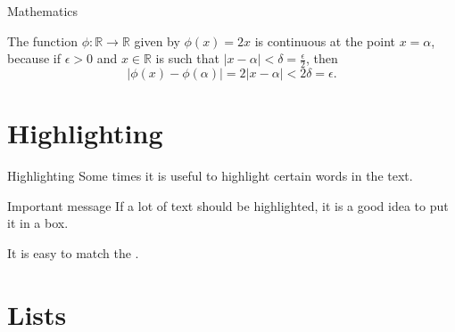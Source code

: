 \documentclass[UKenglish]{beamer}
\begin{document}
\begin{frame}{Mathematics}
    \begin{example}
        The function \(\phi \colon \mathbb{R} \to \mathbb{R}\) given by \(\phi(x) = 2x\) is continuous at the point \(x = \alpha\),
        because if \(\epsilon > 0\) and \(x \in \mathbb{R}\) is such that \(\lvert x - \alpha \rvert < \delta = \frac{\epsilon}{2}\),
        then
        \begin{equation*}
            \lvert \phi(x) - \phi(\alpha)\rvert = 2\lvert x - \alpha \rvert < 2\delta = \epsilon.
        \end{equation*}
    \end{example}
\end{frame}



\section{Highlighting}
\SectionPage


\begin{frame}{Highlighting}
    Some times it is useful to \alert{highlight} certain words in the text.
    
    \begin{alertblock}{Important message}
        If a lot of text should be \alert{highlighted}, it is a good idea to put it in a box.
    \end{alertblock}
    
    It is easy to match the .
\end{frame}


\section{Lists}
\end{document}
